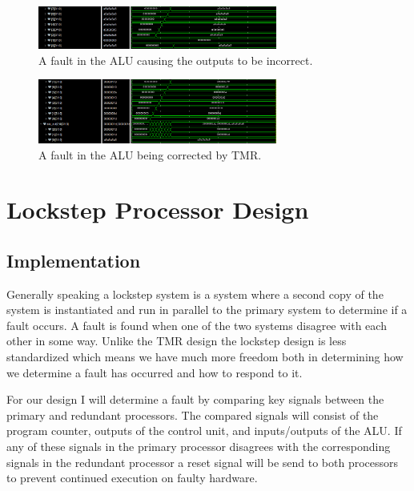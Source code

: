 \documentclass[12pt]{article}
\begin{document}
\begin{figure}[H]
    \centering
    \includegraphics[width=0.7\textwidth]{aluFault.PNG}
    \caption{A fault in the ALU causing the outputs to be incorrect.}
    \label{fig:aluFault}
\end{figure}

\begin{figure}[H]
    \centering
    \includegraphics[width=0.7\textwidth]{tmrSuccess.PNG}
    \caption{A fault in the ALU being corrected by TMR.}
    \label{fig:tmrSuccess}
\end{figure}

\section{Lockstep Processor Design}
\subsection{Implementation}
Generally speaking a lockstep system is a system where a second copy of the system is instantiated and run in parallel to the primary system to determine if a fault occurs. A fault is found when one of the two systems disagree with each other in some way. Unlike the TMR design the lockstep design is less standardized which means we have much more freedom both in determining how we determine a fault has occurred and how to respond to it.

For our design I will determine a fault by comparing key signals between the primary and redundant processors. The compared signals will consist of the program counter, outputs of the control unit, and inputs/outputs of the ALU. If any of these signals in the primary processor disagrees with the corresponding signals in the redundant processor a reset signal will be send to both processors to prevent continued execution on faulty hardware.

\end{document}
